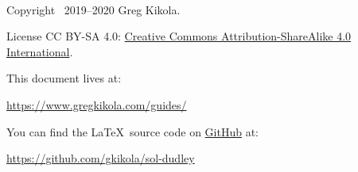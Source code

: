 \ \vspace{30mm}

\noindent Copyright \textcopyright\ 2019--2020 Greg Kikola.

\noindent License CC BY-SA 4.0:
\href{http://creativecommons.org/licenses/by-sa/4.0/}{Creative Commons
  Attribution-ShareAlike 4.0 International}.
\vspace{30mm}

\noindent This document lives at:
\begin{center}
  \href{https://www.gregkikola.com/guides/}
  {https://www.gregkikola.com/guides/}
\end{center}
You can find the \LaTeX\ source code on
\href{https://github.com/}{GitHub} at:
\begin{center}
  \href{https://github.com/gkikola/sol-dudley}
  {https://github.com/gkikola/sol-dudley}
\end{center}
